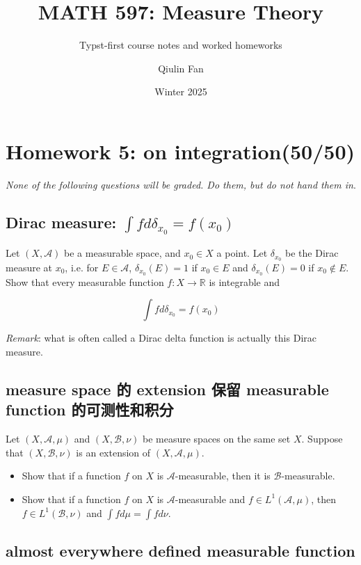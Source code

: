 \documentclass{qlnotes-export}
\title{MATH 597: Measure Theory}
\subtitle{Typst-first course notes and worked homeworks}
\author{Qiulin Fan}
\date{Winter 2025}
\begin{document}
\mainmatter
\chapter{Homework 5: on integration(50/50)}\label{homework-5-on-integration5050}

\emph{None of the following questions will be graded. Do them, but do not hand them in}.

\section{\texorpdfstring{Dirac measure: \(\int f d\delta_{x_{0}} = f(x_{0})\)}{Dirac measure: \textbackslash int f d\textbackslash delta\_\{x\_\{0\}\} = f(x\_\{0\})}}\label{dirac-measure-int-f-ddelta_x_0-fx_0}

Let \((X,\mathcal{A})\) be a measurable space, and \(x_{0} \in X\) a point. Let \(\delta_{x_{0}}\) be the Dirac measure at \(x_{0}\), i.e. for \(E \in \mathcal{A}\), \(\delta_{x_{0}}(E) = 1\) if \(x_{0} \in E\) and \(\delta_{x_{0}}(E) = 0\) if \(x_{0} \notin E\). Show that every measurable function \(f:X\rightarrow{\mathbb{R}}\) is integrable and

\[\int f d\delta_{x_{0}} = f(x_{0})\]

\emph{Remark}: what is often called a Dirac delta function is actually this Dirac measure.

\section{measure space 的 extension 保留 measurable function 的可测性和积分}\label{measure-space-ux7684-extension-ux4fddux7559-measurable-function-ux7684ux53efux6d4bux6027ux548cux79efux5206}

Let \((X,\mathcal{A},\mu)\) and \((X,\mathcal{B},\nu)\) be measure spaces on the same set \(X\). Suppose that \((X,\mathcal{B},\nu)\) is an extension of \((X,\mathcal{A},\mu)\).

\begin{itemize}
\item
  Show that if a function \(f\) on \(X\) is \(\mathcal{A}\)-measurable, then it is \(\mathcal{B}\)-measurable.
\item
  Show that if a function \(f\) on \(X\) is \(\mathcal{A}\)-measurable and \(f \in L^{1}(\mathcal{A},\mu)\), then \(f \in L^{1}(\mathcal{B},\nu)\) and \(\int f d\mu = \int f d\nu\).
\end{itemize}

\section{almost everywhere defined measurable function}\label{almost-everywhere-defined-measurable-function}
\end{document}
